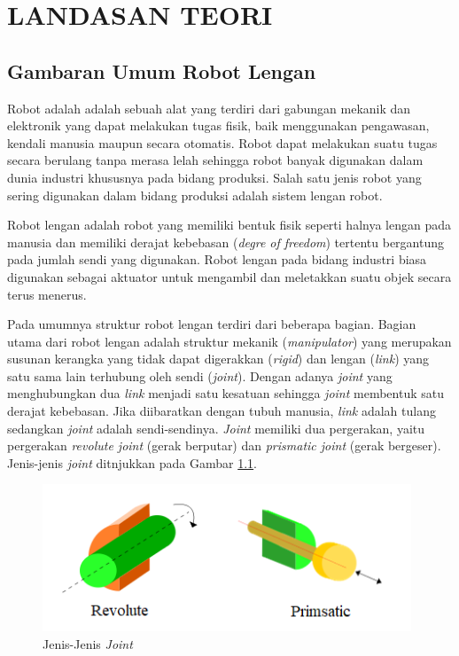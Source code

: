 \chapter{LANDASAN TEORI}

\section{Gambaran Umum Robot Lengan}

Robot adalah adalah sebuah alat yang terdiri dari gabungan mekanik dan elektronik yang dapat melakukan tugas fisik, baik menggunakan pengawasan, kendali manusia maupun secara otomatis. Robot dapat melakukan suatu tugas secara berulang tanpa merasa lelah sehingga robot banyak digunakan dalam dunia industri khususnya pada bidang produksi. Salah satu jenis robot yang sering digunakan dalam bidang produksi adalah sistem lengan robot\cite{Pandu}.

Robot lengan adalah robot yang memiliki bentuk fisik seperti halnya lengan pada manusia dan memiliki derajat kebebasan (\emph{degre of freedom}) tertentu bergantung pada jumlah sendi yang digunakan. Robot lengan pada bidang industri biasa digunakan sebagai aktuator untuk mengambil dan meletakkan suatu objek secara terus menerus.


Pada umumnya struktur robot lengan terdiri dari beberapa bagian.  Bagian utama dari robot lengan adalah struktur mekanik ({\textit{manipulator}}) yang merupakan susunan kerangka yang tidak dapat digerakkan (\emph{rigid}) dan lengan (\emph{link}) yang satu sama lain terhubung oleh sendi (\emph {joint}). Dengan adanya \emph{joint} yang menghubungkan dua \emph{link} menjadi satu kesatuan sehingga \emph{joint} membentuk satu derajat kebebasan. Jika diibaratkan dengan tubuh manusia, \emph{link} adalah tulang sedangkan \emph{joint} adalah sendi-sendinya. \emph{Joint} memiliki dua pergerakan, yaitu pergerakan \emph{revolute joint} (gerak berputar) dan \emph{prismatic joint} (gerak bergeser)\cite{mahmud2012}. Jenis-jenis \textit{joint} ditnjukkan pada Gambar \ref{pic.jenisjoint}.

\begin{figure}[H]
	\centering
	\includegraphics[width=11cm]{gambar/joint.png}
	\caption{Jenis-Jenis \textit{Joint}}
	\label{pic.jenisjoint}
\end{figure}


